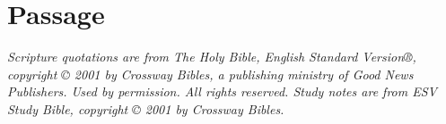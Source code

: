 \documentclass{bible-study-handout}
\begin{document}
\section{Passage}


\begin{fullwidth}
\bigskip\scriptsize\textit{Scripture quotations are from The Holy Bible, English Standard Version®, copyright © 2001 by Crossway Bibles, a publishing ministry of Good News Publishers. Used by permission. All rights reserved. Study notes are from ESV Study Bible, copyright © 2001 by Crossway Bibles.}
\end{fullwidth}
\end{document}

